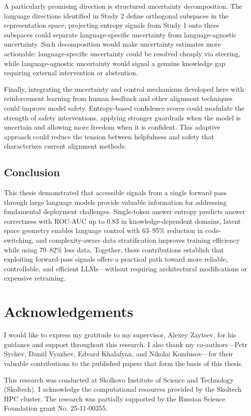 A particularly promising direction is structured uncertainty decomposition. The language directions identified in Study 2 define orthogonal subspaces in the representation space; projecting entropy signals from Study 1 onto these subspaces could separate language-specific uncertainty from language-agnostic uncertainty. Such decomposition would make uncertainty estimates more actionable: language-specific uncertainty could be resolved cheaply via steering, while language-agnostic uncertainty would signal a genuine knowledge gap requiring external intervention or abstention.

Finally, integrating the uncertainty and control mechanisms developed here with reinforcement learning from human feedback and other alignment techniques could improve model safety. Entropy-based confidence scores could modulate the strength of safety interventions, applying stronger guardrails when the model is uncertain and allowing more freedom when it is confident. This adaptive approach could reduce the tension between helpfulness and safety that characterizes current alignment methods.

\section{Conclusion}

This thesis demonstrated that accessible signals from a single forward pass through large language models provide valuable information for addressing fundamental deployment challenges. Single-token answer entropy predicts answer correctness with ROC-AUC up to 0.83 in knowledge-dependent domains, latent space geometry enables language control with 63--95\% reduction in code-switching, and complexity-aware data stratification improves training efficiency while using 79--82\% less data. Together, these contributions establish that exploiting forward-pass signals offers a practical path toward more reliable, controllable, and efficient LLMs---without requiring architectural modifications or expensive retraining.

\newpage
\chapter*{Acknowledgements}

I would like to express my gratitude to my supervisor, Alexey Zaytsev, for his guidance and support throughout this research. I also thank my co-authors---Petr Sychev, Daniil Vyazhev, Edvard Khalafyan, and Nikolai Kondusov---for their valuable contributions to the published papers that form the basis of this thesis.

This research was conducted at Skolkovo Institute of Science and Technology (Skoltech). I acknowledge the computational resources provided by the Skoltech HPC cluster. The research was partially supported by the Russian Science Foundation grant No. 25-11-00355.
